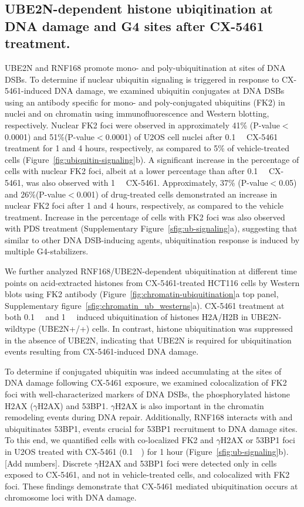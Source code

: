 \subsection{UBE2N-dependent histone ubiqitination at DNA damage and G4 sites after CX-5461 treatment.}
UBE2N and RNF168 promote mono- and poly-ubiquitination at sites of DNA DSBs. To determine if nuclear ubiquitin signaling is triggered in response to CX-5461-induced DNA damage, we examined ubiquitin conjugates at DNA DSBs using an antibody specific for mono- and poly-conjugated ubiquitins (FK2) in nuclei and on chromatin using immunofluorescence and Western blotting, respectively. Nuclear FK2 foci were observed in approximately 41\% (P-value$<$0.0001) and 51\%(P-value$<$0.0001) of U2OS cell nuclei after \SI{0.1}{\micro\Molar} CX-5461 treatment for 1 and 4 hours, respectively, as compared to 5\% of vehicle-treated cells (Figure~\ref{fig:ubiquitin-signaling}b). A significant increase in the percentage of cells with nuclear FK2 foci, albeit at a lower percentage than after \SI{0.1}{\micro\Molar} CX-5461, was also observed with \SI{1}{\micro\Molar} CX-5461. Approximately, 37\% (P-value$<$0.05) and 26\%(P-value$<$0.001) of drug-treated cells demonstrated an increase in nuclear FK2 foci after 1 and 4 hours, respectively, as compared to the vehicle treatment. Increase in the percentage of cells with FK2 foci was also observed with PDS treatment (Supplementary Figure~\ref{sfig:ub-signaling}a), suggesting that similar to other DNA DSB-inducing agents, ubiquitination response is induced by multiple G4-stabilizers.

We further analyzed RNF168/UBE2N-dependent ubiquitination at different time points on acid-extracted histones from CX-5461-treated HCT116 cells by Western blots using FK2 antibody (Figure~\ref{fig:chromatin-ubiquitination}a top panel, Supplementary figure~\ref{sfig:chromatin_ub_westerns}a). CX-5461 treatment at both \SI{0.1}{\micro\Molar} and \SI{1}{\micro\Molar} induced ubiquitination of histones H2A/H2B in UBE2N-wildtype (UBE2N+/+) cells. In contrast, histone ubiquitination was suppressed in the absence of UBE2N, indicating that UBE2N is required for ubiquitination events resulting from CX-5461-induced DNA damage.

To determine if conjugated ubiquitin was indeed accumulating at the sites of DNA damage following CX-5461 exposure, we examined colocalization of FK2 foci with well-characterized markers of DNA DSBs, the phosphorylated histone H2AX ($\gamma$H2AX) and 53BP1. $\gamma$H2AX is also important in the chromatin remodeling events during DNA repair. Additionally, RNF168 interacts with and ubiquitinates 53BP1, events crucial for 53BP1 recruitment to DNA damage sites\cite{Fradet-Turcotte2013a}. To this end, we quantified cells with co-localized FK2 and $\gamma$H2AX or 53BP1 foci in U2OS treated with CX-5461 (\SI{0.1}{\micro\Molar}) for 1 hour (Figure~\ref{sfig:ub-signaling}b).[Add numbers]. Discrete $\gamma$H2AX and 53BP1 foci were detected only in cells exposed to CX-5461, and not in vehicle-treated cells, and colocalized with FK2 foci. These findings demonstrate that CX-5461 mediated ubiquitination occurs at chromosome loci with DNA damage.

